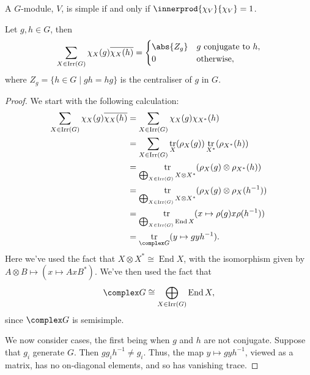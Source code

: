 \documentclass[fleqn]{NotesClass}
\DeclareMathOperator{\End}{End}
\newcommand{\isomorphic}{\cong}
\DeclareMathOperator{\Irr}{Irr}
\DeclareMathOperator{\tr}{tr}
\begin{document}
    \begin{crl}{}{}
        A \(G\)-module, \(V\), is simple if and only if \(\innerprod{\chi_V}{\chi_V} = 1\).
    \end{crl}
    
    \begin{thm}{}{}
        Let \(g, h \in G\), then
        \begin{equation}
            \sum_{X \in \Irr(G)} \chi_X(g) \overline{\chi_X(h)} = 
            \begin{cases}
                \abs{Z_g} & g \text{ conjugate to }h,\\
                0 & \text{otherwise},
            \end{cases}
        \end{equation}
        where \(Z_g = \{h \in G \mid gh = hg\}\) is the centraliser of \(g\) in \(G\).
        \begin{proof}
            We start with the following calculation:
            \begin{align}
                \sum_{X \in \Irr(G)} \chi_X(g) \overline{\chi_X(h)} &= \sum_{X \in \Irr(G)} \chi_X(g) \chi_{X^*}(h)\\
                &= \sum_{X \in \Irr(G)} \tr_X(\rho_X(g)) \tr_{X^*}(\rho_{X^*}(h))\\
                &= \tr_{\bigoplus_{X \in \Irr(G)} X \otimes X^*} (\rho_X(g) \otimes \rho_{X^*}(h))\\
                &= \tr_{\bigoplus_{X \in \Irr(G)} X \otimes X^*} (\rho_X(g) \otimes \rho_X(h^{-1}))\\
                &= \tr_{\bigoplus_{X \in \Irr(G)} \End X} (x \mapsto \rho(g)x\rho(h^{-1}))\\
                &= \tr_{\complex G} (y \mapsto gyh^{-1}).
            \end{align}
            Here we've used the fact that \(X \otimes X^* \isomorphic \End X\), with the isomorphism given by \(A \otimes B \mapsto (x \mapsto AxB^*)\).
            We've then used the fact that
            \begin{equation}
                \complex G \isomorphic \bigoplus_{X \in \Irr(G)} \End X,
            \end{equation}
            since \(\complex G\) is semisimple.
            
            We now consider cases, the first being when \(g\) and \(h\) are not conjugate.
            Suppose that \(g_i\) generate \(G\).
            Then \(gg_ih^{-1} \ne g_i\).
            Thus, the map \(y \mapsto gyh^{-1}\), viewed as a matrix, has no on-diagonal elements, and so has vanishing trace.
            

\end{proof}
\end{thm}
\end{document}
